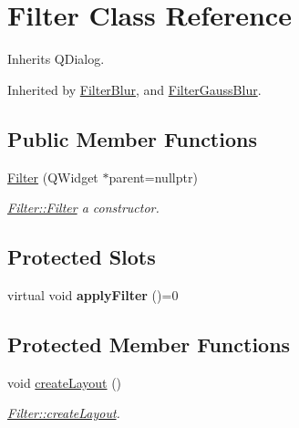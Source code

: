 \hypertarget{class_filter}{}\section{Filter Class Reference}
\label{class_filter}


Inherits Q\+Dialog.



Inherited by \mbox{\hyperlink{class_filter_blur}{Filter\+Blur}}, and \mbox{\hyperlink{class_filter_gauss_blur}{Filter\+Gauss\+Blur}}.

\subsection*{Public Member Functions}
\begin{DoxyCompactItemize}
\item 
\mbox{\hyperlink{class_filter_a24f108385782efbcc0b7f9cc96506322}{Filter}} (Q\+Widget $\ast$parent=nullptr)
\begin{DoxyCompactList}\small\item\em \mbox{\hyperlink{class_filter_a24f108385782efbcc0b7f9cc96506322}{Filter\+::\+Filter}} a constructor. \end{DoxyCompactList}\end{DoxyCompactItemize}
\subsection*{Protected Slots}
\begin{DoxyCompactItemize}
\item 
\mbox{\label{class_filter_a82bf0de80a320ff1500b0d7d7f857897}} 
virtual void {\bfseries apply\+Filter} ()=0
\end{DoxyCompactItemize}
\subsection*{Protected Member Functions}
\begin{DoxyCompactItemize}
\item 
void \mbox{\hyperlink{class_filter_a693e18ecd85c957363367e636f8ba2e7}{create\+Layout}} ()
\begin{DoxyCompactList}\small\item\em \mbox{\hyperlink{class_filter_a693e18ecd85c957363367e636f8ba2e7}{Filter\+::create\+Layout}}. \end{DoxyCompactList}\end{DoxyCompactItemize}

